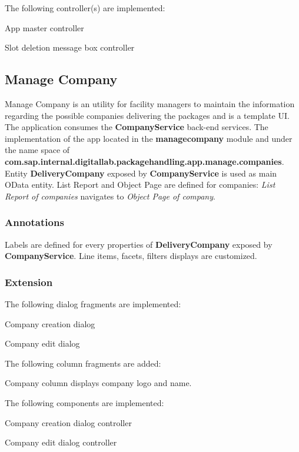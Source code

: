 \bigskip
The following controller(s) are implemented:
\begin{compactenum}
    \item App master controller
    \item Slot deletion message box controller
\end{compactenum}

\subsection{Manage Company}

Manage Company is an utility for facility managers to maintain the information regarding the possible companies delivering the packages and is a template UI.
The application consumes the \textbf{CompanyService} back-end services.
The implementation of the app
located in the \textbf{managecompany} module and under the name space of
\textbf{com.sap.internal.digitallab.packagehandling.app.manage.companies}.
Entity \textbf{DeliveryCompany} exposed by  \textbf{CompanyService} is used as main OData entity.
List Report and Object Page are defined for companies: \textit{List Report of companies} navigates to \textit{Object Page of company}.

\subsubsection{Annotations}
Labels are defined for every properties of \textbf{DeliveryCompany} exposed by \textbf{CompanyService}. 
Line items, facets, filters displays are customized.

\subsubsection{Extension}

The following dialog fragments are implemented:
\begin{compactenum}
    \item Company creation dialog
    \item Company edit dialog
\end{compactenum}

\bigskip
The following column fragments are added:
\begin{compactenum}
    \item Company column displays company logo and name.
\end{compactenum}

\bigskip
The following components are implemented:
\begin{compactenum}
    \item Company creation dialog controller
    \item Company edit dialog controller
\end{compactenum}

